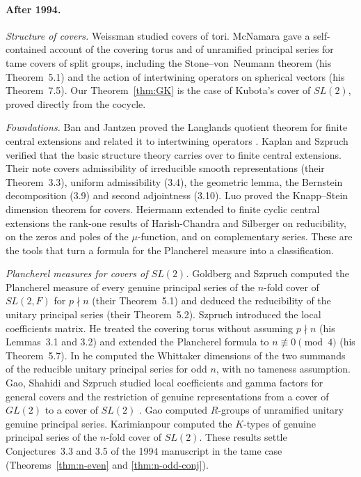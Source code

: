 \documentclass[12pt,letterpaper]{article}
\numberwithin{equation}{section}
\theoremstyle{definition}
\begin{document}
\paragraph{After 1994.}
\emph{Structure of covers.}  Weissman \cite{We09} studied covers of tori.  McNamara
\cite{Mc12} gave a self-contained account of the covering torus and of unramified
principal series for tame covers of split groups, including the Stone--von~Neumann theorem
(his Theorem~5.1) and the action of intertwining operators on spherical vectors (his
Theorem~7.5).  Our Theorem~\ref{thm:GK} is the case of Kubota's cover of $SL(2)$, proved
directly from the cocycle.

\emph{Foundations.}  Ban and Jantzen proved the Langlands quotient theorem for finite
central extensions \cite{BJ13} and related it to intertwining operators \cite{BJ16}.
Kaplan and Szpruch \cite{KS23} verified that the basic structure theory carries over to
finite central extensions.  Their note covers admissibility of irreducible smooth
representations (their Theorem~3.3), uniform admissibility (3.4), the geometric lemma, the
Bernstein decomposition (3.9) and second adjointness (3.10).  Luo \cite{Lu20} proved the
Knapp--Stein dimension theorem for covers.  Heiermann \cite{He25} extended to finite
cyclic central extensions the rank-one results of Harish-Chandra and Silberger on
reducibility, on the zeros and poles of the $\mu$-function, and on complementary series.
These are the tools that turn a formula for the Plancherel measure into a classification.

\emph{Plancherel measures for covers of $SL(2)$.}  Goldberg and Szpruch \cite{GS16}
computed the Plancherel measure of every genuine principal series of the $n$-fold cover
of $SL(2,F)$ for $p\nmid n$ (their Theorem~5.1) and deduced the reducibility of the unitary
principal series (their Theorem~5.2).  Szpruch \cite{Sz19} introduced the local
coefficients matrix.  He treated the covering torus without assuming $p\nmid n$ (his
Lemmas~3.1 and 3.2) and extended the Plancherel formula to $n\not\equiv0\pmod 4$ (his
Theorem~5.7).  In \cite{Sz24} he computed the Whittaker dimensions of the two summands of
the reducible unitary principal series for odd $n$, with no tameness assumption.  Gao,
Shahidi and Szpruch studied local coefficients and gamma factors for general covers
\cite{GSS23} and the restriction of genuine representations from a cover of $GL(2)$ to a
cover of $SL(2)$ \cite{GSS26}.  Gao \cite{Ga23} computed $R$-groups of unramified unitary
genuine principal series.  Karimianpour \cite{Ka18} computed the $K$-types of genuine
principal series of the $n$-fold cover of $SL(2)$.  These results settle
Conjectures~3.3 and 3.5 of the 1994 manuscript in the tame case
(Theorems~\ref{thm:n-even} and \ref{thm:n-odd-conj}).
\end{document}
